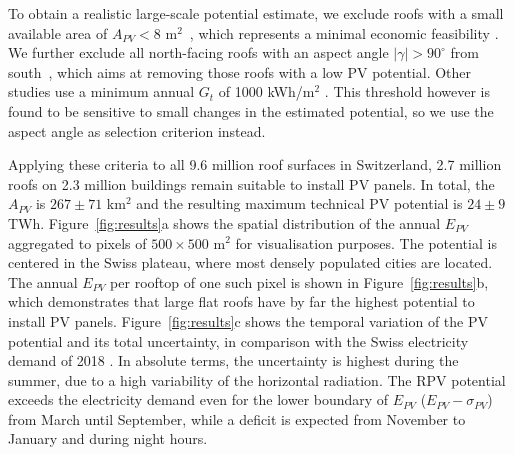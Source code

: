 To obtain a realistic large-scale potential estimate, we exclude roofs with a small available area of $A_{PV}<8$ m$^2$~\cite{assouline_large-scale_2018}, which represents a minimal economic feasibility \cite{assouline_quantifying_2017, assouline_large-scale_2018, portmann_sonnendach.ch:_2016, romero_rodriguez_assessment_2017}. 
We further exclude all north-facing roofs with an aspect angle $|\gamma| > 90^\circ$ from south~\cite{assouline_large-scale_2018, assouline_quantifying_2017}, which aims at removing those roofs with a low PV potential. Other studies use a minimum annual $G_t$ of 1000 kWh/m$^2$ \cite{buffat_scalable_2018, portmann_sonnendach.ch:_2016, romero_rodriguez_assessment_2017}. This threshold however is found to be sensitive to small changes in the estimated potential, so we use the aspect angle as selection criterion instead.

Applying these criteria to all 9.6 million roof surfaces in Switzerland, 2.7 million roofs on 2.3 million buildings remain suitable to install PV panels. 
In total, the $A_{PV}$ is $267 \pm 71$ km$^2$ and the resulting maximum technical PV potential is $24 \pm 9$ TWh. Figure~\ref{fig:results}a shows the spatial distribution of the annual $E_{PV}$ aggregated to pixels of $500 \times 500$ m$^2$ for visualisation purposes. The potential is centered in the Swiss plateau, where most densely populated cities are located.
%
The annual $E_{PV}$ per rooftop of one such pixel is shown in Figure~\ref{fig:results}b, which demonstrates that large flat roofs have by far the highest potential to install PV panels.
%
Figure~\ref{fig:results}c shows the temporal variation of the PV potential and its total uncertainty, in comparison with the Swiss electricity demand of 2018 \cite{swissgrid_production_2019}. In absolute terms, the uncertainty is highest during the summer, due to a high variability of the horizontal radiation. The RPV potential exceeds the electricity demand even for the lower boundary of $E_{PV}$ ($E_{PV} - \sigma_{PV}$) from March until September, while a deficit is expected from November to January and during night hours. 

